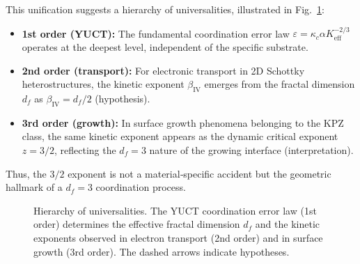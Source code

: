\documentclass[12pt,a4paper]{article}
\begin{document}
	This unification suggests a hierarchy of universalities, illustrated
	in Fig.~\ref{fig:hierarchy}:
	\begin{itemize}
		\item \textbf{1st order (YUCT):} The fundamental coordination error
		law $\varepsilon = \kappa_c \alpha K_{\mathrm{eff}}^{-2/3}$ operates
		at the deepest level, independent of the specific substrate.
		\item \textbf{2nd order (transport):} For electronic transport in
		2D Schottky heterostructures, the kinetic exponent $\beta_{\mathrm{IV}}$
		emerges from the fractal dimension $d_f$ as $\beta_{\mathrm{IV}} = d_f/2$
		(hypothesis).
		\item \textbf{3rd order (growth):} In surface growth phenomena belonging
		to the KPZ class, the same kinetic exponent appears as the dynamic
		critical exponent $z = 3/2$, reflecting the $d_f = 3$ nature of the
		growing interface (interpretation).
	\end{itemize}
	Thus, the $3/2$ exponent is not a material‑specific accident but the
	geometric hallmark of a $d_f = 3$ coordination process.
	
	\begin{figure}[htbp]
		\centering
		\caption{Hierarchy of universalities. The YUCT coordination error law
			(1st order) determines the effective fractal dimension $d_f$ and the
			kinetic exponents observed in electron transport (2nd order) and in
			surface growth (3rd order). The dashed arrows indicate hypotheses.}
		\label{fig:hierarchy}
	\end{figure}
	
\end{document}
